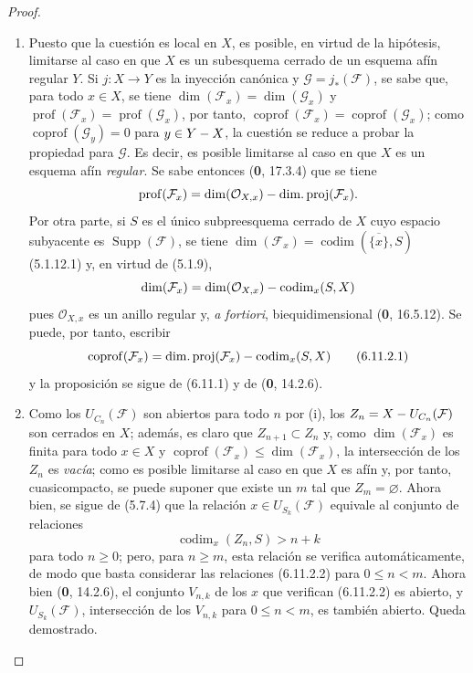 \begin{proof}
\begin{enumerate}
\item[(i)] Puesto que la cuestión es local en $X$, es posible, en virtud de
la hipótesis, limitarse al caso en que $X$ es un subesquema cerrado de un esquema
afín regular $Y$. Si $j:X\to Y$ es la inyección canónica y
$\mathcal G=j_*(\mathcal F)$, se sabe que, para todo $x\in X$, se tiene
$\dim(\mathcal F_x)=\dim(\mathcal G_x)$ y
$\operatorname{prof}(\mathcal F_x)=\operatorname{prof}(\mathcal G_x)$,
por tanto, $\operatorname{coprof}(\mathcal F_x)=
\operatorname{coprof}(\mathcal G_x)$; como
$\operatorname{coprof}(\mathcal G_y)=0$ para $y\in Y- X$, la cuestión se reduce a
probar la propiedad para $\mathcal G$. Es decir, es posible limitarse al
caso en que $X$ es un esquema afín \emph{regular}. Se sabe entonces (\textbf 0, 17.3.4) que
se tiene
\[
\operatorname{prof}(\mathcal F_x)=\dim(\mathcal O_{X,x})-
\operatorname{dim.proj}(\mathcal F_x).
\]
Por otra parte, si $S$ es el único subpreesquema cerrado de $X$ cuyo
espacio subyacente es $\operatorname{Supp}(\mathcal F)$, se tiene
$\dim(\mathcal F_x)=\operatorname{codim}(\overline{\{x\}},S)$ (5.1.12.1) y, en
virtud de (5.1.9),
\[
\dim(\mathcal F_x)=\dim(\mathcal O_{X,x})-\operatorname{codim}_x(S,X)
\]
pues $\mathcal O_{X,x}$ es un anillo regular y, \emph{a fortiori},
biequidimensional (\textbf 0, 16.5.12). Se puede, por tanto, escribir
\begin{equation}
\operatorname{coprof}(\mathcal F_x)=
\operatorname{dim.proj}(\mathcal F_x)-\operatorname{codim}_x(S,X)
\tag{6.11.2.1}\label{IV.2.s6.11.2.1-fr}
\end{equation}
y la proposición se sigue de (6.11.1) y de (\textbf 0, 14.2.6).

\item[(ii)] Como los $U_{C_n}(\mathcal F)$ son abiertos para todo $n$ por
(i), los $Z_n=X- U_{C_n}(\mathcal F)$ son cerrados en $X$; además, es
claro que $Z_{n+1}\subset Z_n$ y, como $\dim(\mathcal F_x)$ es finita
para todo $x\in X$ y
$\operatorname{coprof}(\mathcal F_x)\leq\dim(\mathcal F_x)$,
la intersección de los $Z_n$ es \emph{vacía}; como es posible limitarse al caso en que $X$
es afín y, por tanto, cuasicompacto, se puede suponer que existe un $m$
tal que $Z_m=\varnothing$. Ahora bien, se sigue de (5.7.4) que la relación
$x\in U_{S_k}(\mathcal F)$ equivale al conjunto de relaciones
\begin{equation}
\operatorname{codim}_x(Z_n,S)>n+k
\tag{6.11.2.2}\label{IV.2.s6.11.2.2-fr}
\end{equation}
para todo $n\geq0$; pero, para $n\geq m$, esta relación se verifica
automáticamente, de modo que basta considerar las relaciones (6.11.2.2)
para $0\leq n<m$. Ahora bien (\textbf 0, 14.2.6), el conjunto $V_{n,k}$ de los $x$ que verifican
(6.11.2.2) es abierto, y $U_{S_k}(\mathcal F)$, intersección de los $V_{n,k}$
para $0\leq n<m$, es también abierto. Queda demostrado.
\end{enumerate}
\end{proof}

